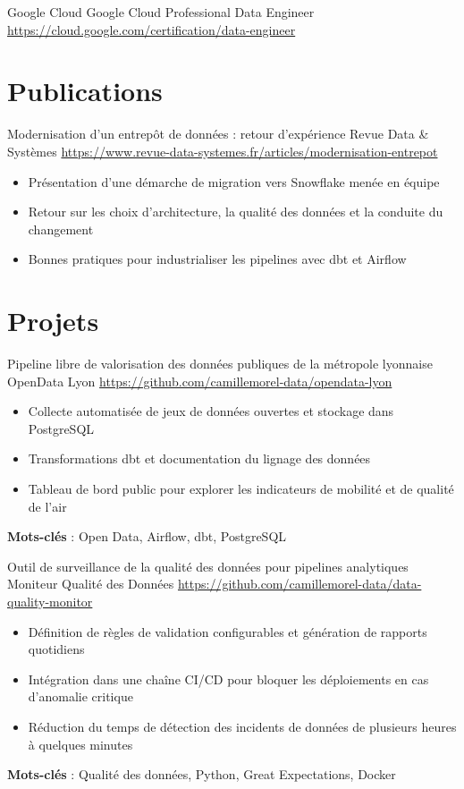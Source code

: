 \documentclass[a4paper, serif, 10pt]{moderncv}
\begin{document}
        {Google Cloud}
        {Google Cloud Professional Data Engineer}
        {\url{https://cloud.google.com/certification/data-engineer}}
        {}
        {}
\section{Publications}

        {Modernisation d'un entrepôt de données : retour d'expérience}
        {Revue Data \& Systèmes}
        {\url{https://www.revue-data-systemes.fr/articles/modernisation-entrepot}}
        {}
        {\begin{itemize}
\item Présentation d'une démarche de migration vers Snowflake menée en équipe
\item Retour sur les choix d'architecture, la qualité des données et la conduite du changement
\item Bonnes pratiques pour industrialiser les pipelines avec dbt et Airflow
\end{itemize}}
\section{Projets}

        {Pipeline libre de valorisation des données publiques de la métropole lyonnaise}
        {OpenData Lyon}
        {\url{https://github.com/camillemorel-data/opendata-lyon}}
        {}
        {\begin{itemize}
\item Collecte automatisée de jeux de données ouvertes et stockage dans PostgreSQL
\item Transformations dbt et documentation du lignage des données
\item Tableau de bord public pour explorer les indicateurs de mobilité et de qualité de l'air
\end{itemize}
\textbf{Mots-clés} : Open Data, Airflow, dbt, PostgreSQL}

        {Outil de surveillance de la qualité des données pour pipelines analytiques}
        {Moniteur Qualité des Données}
        {\url{https://github.com/camillemorel-data/data-quality-monitor}}
        {}
        {\begin{itemize}
\item Définition de règles de validation configurables et génération de rapports quotidiens
\item Intégration dans une chaîne CI/CD pour bloquer les déploiements en cas d'anomalie critique
\item Réduction du temps de détection des incidents de données de plusieurs heures à quelques minutes
\end{itemize}
\textbf{Mots-clés} : Qualité des données, Python, Great Expectations, Docker}
\end{document}
